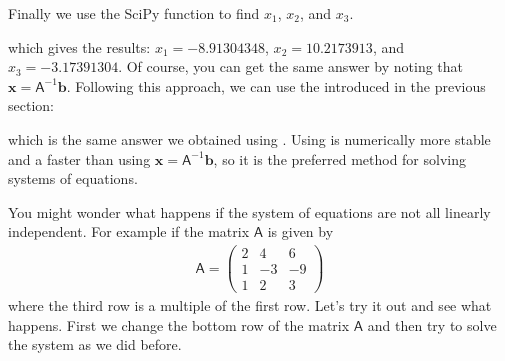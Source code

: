\documentclass[letterpaper,10pt,english]{sphinxmanual}
\begin{document}
\sphinxAtStartPar
Finally we use the SciPy function  to find \(x_1\), \(x_2\), and \(x_3\).

\begin{sphinxVerbatim}[commandchars=\\\{\}]
\PYG{p}{[}      \PYG{p}{]}
\end{sphinxVerbatim}

\sphinxAtStartPar
which gives the results: \(x_1=-8.91304348\), \(x_2= 10.2173913\), and \(x_3= -3.17391304\).  Of course, you can get the same answer by noting that \(\mathbf{x}=\mathsf{A}^{-1}\mathbf{b}\).  Following this approach, we can use the  introduced in the previous section:

\begin{sphinxVerbatim}[commandchars=\\\{\}]

 
\PYG{p}{[}      \PYG{p}{]}
\end{sphinxVerbatim}

\sphinxAtStartPar
which is the same answer we obtained using .  Using  is numerically more stable and a faster than using \(\mathbf{x}=\mathsf{A}^{-1}\mathbf{b}\), so it is the preferred method for solving systems of equations.

\sphinxAtStartPar
You might wonder what happens if the system of equations are not all linearly independent.  For example if the matrix \(\mathsf{A}\) is given by
\begin{equation*}
\begin{split}\mathsf{A} = \left(\begin{array}{ccc}2 &  4 &  6 \\
                                     1 & -3 & -9 \\
                                     1 &  2 &  3 \end{array}\right)\end{split}
\end{equation*}
\sphinxAtStartPar
where the third row is a multiple of the first row.  Let’s try it out and see what happens.  First we change the bottom row of the matrix \(\mathsf{A}\) and then try to solve the system as we did before.
\end{document}
